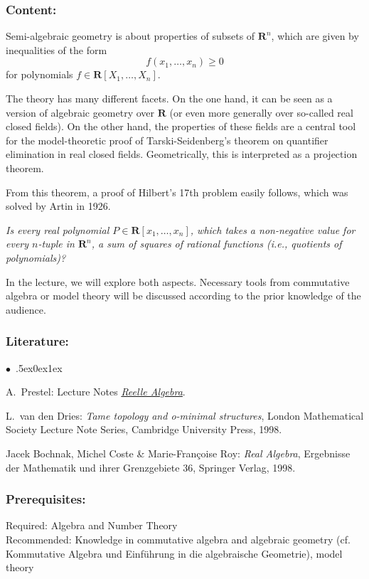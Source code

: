 \documentclass[a4paper,10pt]{article}
\renewenvironment{itemize}{\begin{list}{$\bullet$\ }{\itemsep.5ex\setlength{\topsep}{0.5\itemsep}\parsep0ex\labelsep1ex\settowidth{\labelwidth}{$\bullet$\ }\setlength{\leftmargin}{\labelwidth}\addtolength{\leftmargin}{3ex}\addtolength{\leftmargin}{\labelsep}}}{\end{list}}
\begin{document}
\subsubsection*{\large
    Content:
}
Semi-algebraic geometry is about properties of subsets of $\textbf{R}^n$, which are given by inequalities of the form
\[ f(x_1, \dots, x_n)\geq 0\]
for polynomials $f\in\textbf{R}[X_1,\dots,X_n]$.

The theory has many different facets. On the one hand, it can be seen as a version of algebraic geometry over $\mathbf{R}$ (or even more generally over so-called real closed fields). On the other hand, the properties of these fields are a central tool for the model-theoretic proof of Tarski-Seidenberg's theorem on quantifier elimination in real closed fields. Geometrically, this is interpreted as a projection theorem.

From this theorem, a proof of Hilbert's 17th problem easily follows, which was solved by Artin in 1926.

\textit{Is every real polynomial $P \in \mathbf{R}[x_1, \dots, x_n]$, which takes a non-negative value for every $n$-tuple in $\mathbf{R}^n$, a sum of squares of rational functions (i.e., quotients of polynomials)?}

In the lecture, we will explore both aspects. Necessary tools from commutative algebra or model theory will be discussed according to the prior knowledge of the audience.
\subsubsection*{\large
    Literature:
}
\begin{itemize}
\item A.~Prestel: Lecture Notes \href{http://www.math.uni-konstanz.de/\~prestel/raskript.pdf}{\emph{Reelle Algebra}}.
\item
L.~van den Dries: \emph{Tame topology and o-minimal structures}, London Mathematical Society Lecture Note Series, Cambridge University Press, 1998. 
\item
Jacek Bochnak, Michel Coste \& Marie-Françoise Roy: \emph{Real Algebra}, Ergebnisse der Mathematik und ihrer Grenzgebiete 36, Springer Verlag, 1998.
\end{itemize}
\subsubsection*{\large
    Prerequisites:
}
Required: Algebra and Number Theory \\ Recommended: Knowledge in commutative algebra and algebraic geometry (cf. Kommutative Algebra und Einführung in die algebraische Geometrie), model theory
\end{document}
